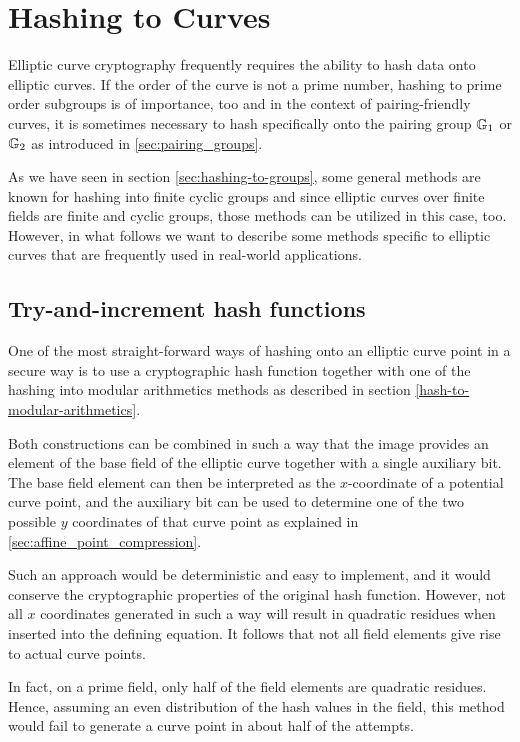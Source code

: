 \section{Hashing to Curves} Elliptic curve cryptography frequently requires the ability to hash data onto elliptic curves. If the order of the curve is not a prime number, hashing to prime order subgroups is of importance, too and in the context of pairing-friendly curves, it is sometimes necessary to hash specifically onto the pairing group $\mathbb{G}_1$ or $\mathbb{G}_2$ as introduced in \ref{sec:pairing_groups}.

As we have seen in section \ref{sec:hashing-to-groups}, some general methods are known for hashing into finite cyclic groups and since elliptic curves over finite fields are finite and cyclic groups, those methods can be utilized in this case, too. However, in what follows we want to describe some methods specific to elliptic curves that are frequently used in real-world applications. 

\subsection{Try-and-increment hash functions}
One of the most straight-forward ways of hashing onto an elliptic curve point in a secure way is to use a cryptographic hash function together with one of the hashing into modular arithmetics methods as described in section \ref{hash-to-modular-arithmetics}.

Both constructions can be combined in such a way that the image provides an element of the base field of the elliptic curve together with a single auxiliary bit. The base field element can then be interpreted as the $x$-coordinate of a potential curve point, and the auxiliary bit can be used to determine one of the two possible $y$ coordinates of that curve point as explained in \ref{sec:affine_point_compression}.

Such an approach would be deterministic and easy to implement, and it would conserve the cryptographic properties of the original hash function. However, not all $x$ coordinates generated in such a way will result in quadratic residues when inserted into the defining equation. It follows that not all field elements give rise to actual curve points. 

In fact,
on a prime field, only half of the field elements are quadratic residues. Hence, assuming an even distribution of the hash values in the field, this method would fail to generate a curve point in about half of the attempts. 

